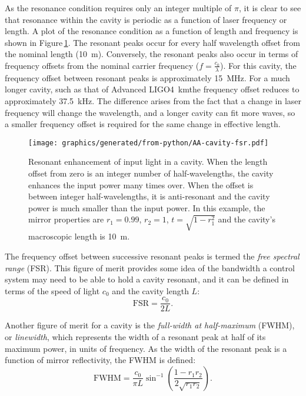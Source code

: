 As the resonance condition requires only an integer multiple of $\pi$, it is clear to see that resonance within the cavity is periodic as a function of laser frequency or length. A plot of the resonance condition as a function of length and frequency is shown in Figure\,\ref{fig:cavity-fsr}. The resonant peaks occur for every half wavelength offset from the nominal length (\SI{10}{\meter}). Conversely, the resonant peaks also occur in terms of frequency offsets from the nominal carrier frequency ($f = \frac{c_0}{\lambda}$). For this cavity, the frequency offset between resonant peaks is approximately \SI{15}{\mega\hertz}. For a much longer cavity, such as that of Advanced LIGO\textemdash \SI{4}{\kilo\meter}\textemdash the frequency offset reduces to approximately \SI{37.5}{\kilo\hertz}. The difference arises from the fact that a change in laser frequency will change the wavelength, and a longer cavity can fit more waves, so a smaller frequency offset is required for the same change in effective length.

\begin{figure}
  \centering
  \texttt{[image: graphics/generated/from-python/AA-cavity-fsr.pdf]}
  \caption[Resonant enhancement of input light in a cavity]{\label{fig:cavity-fsr}Resonant enhancement of input light in a cavity. When the length offset from zero is an integer number of half-wavelengths, the cavity enhances the input power many times over. When the offset is between integer half-wavelengths, it is anti-resonant and the cavity power is much smaller than the input power. In this example, the mirror properties are $r_1 = 0.99$, $r_2 = 1$, $t = \sqrt{1 - r_1^2}$ and the cavity's macroscopic length is \SI{10}{\meter}.}
\end{figure}

The frequency offset between successive resonant peaks is termed the \emph{free spectral range} (\gls{FSR}). This figure of merit provides some idea of the bandwidth a control system may need to be able to hold a cavity resonant, and it can be defined in terms of the speed of light $c_0$ and the cavity length $L$:
\begin{equation}
  \label{eq:fsr}
  \text{FSR} = \frac{c_0}{2L}.
\end{equation}

Another figure of merit for a \FP{} cavity is the \emph{full-width at half-maximum} (\gls{FWHM}), or \emph{linewidth}, which represents the width of a resonant peak at half of its maximum power, in units of frequency. As the width of the resonant peak is a function of mirror reflectivity, the \gls{FWHM} is defined:
\begin{equation}
  \text{FWHM} = \frac{c_0}{\pi L} \sin^{-1}{\left( \frac{1 - r_1 r_2}{2 \sqrt{r_1 r_2}} \right)}.
\end{equation}

